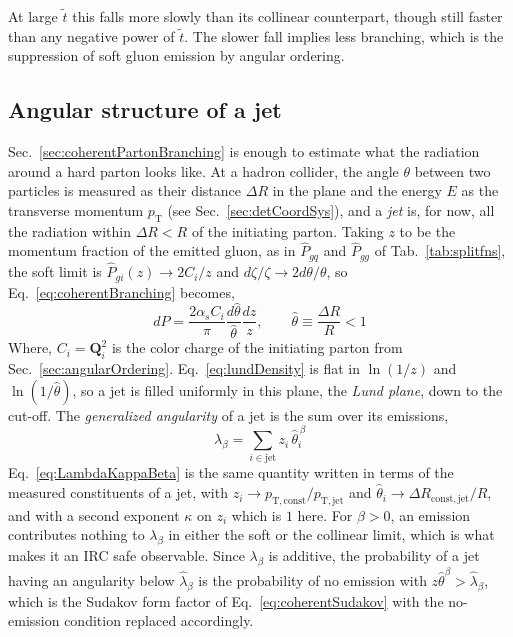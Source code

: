 At large \(\tilde{t}\) this falls more slowly than its collinear counterpart, though
still faster than any negative power of \(\tilde{t}\). The slower fall implies less
branching, which is the suppression of soft gluon emission by angular ordering.

\subsection{Angular structure of a jet}
\label{sec:angularityEstimate}
Sec.~\ref{sec:coherentPartonBranching} is enough to estimate what the radiation around a hard parton looks like. 
%
At a hadron collider, the angle \(\theta\) between two particles is measured as their distance \(\Delta R\) in the \etaphi plane and the energy \(E\) as the transverse momentum \(p_\mathrm{T}\) (see Sec.~\ref{sec:detCoordSys}), and a \emph{jet} is, for now, all the radiation within \(\Delta R < R\) of the initiating parton. 
%
Taking \(z\) to be the momentum fraction of the emitted gluon, as in \(\hat{P}_{gq}\) and \(\hat{P}_{gg}\) of Tab.~\ref{tab:splitfns}, the soft limit is \(\hat{P}_{gi}(z) \to 2C_i/z\) and \(d\zeta/\zeta \to 2d\theta/\theta\), so Eq.~\ref{eq:coherentBranching} becomes,
\begin{equation}
	dP = \frac{2\alpha_s C_i}{\pi}\frac{d\hat{\theta}}{\hat{\theta}}\frac{dz}{z}, \qquad \hat{\theta} \equiv \frac{\Delta R}{R} < 1
	\label{eq:lundDensity}
\end{equation}
Where, \(C_i = \mathbf{Q}_i^2\) is the color charge of the initiating parton from Sec.~\ref{sec:angularOrdering}. 
%
Eq.~\ref{eq:lundDensity} is flat in \(\ln(1/z)\) and \(\ln(1/\hat{\theta})\), so a jet is filled uniformly in this plane, the \emph{Lund plane}, down to the cut-off. 
%
The \emph{generalized angularity} of a jet is the sum over its emissions,
\begin{equation}
	\lambda_\beta = \sum_{i \in \mathrm{jet}} z_i\,\hat{\theta}_i^{\,\beta}
	\label{eq:angularityShower}
\end{equation}
Eq.~\ref{eq:LambdaKappaBeta} is the same quantity written in terms of the measured constituents of a jet, with \(z_i \to p_\mathrm{T, const}/p_\mathrm{T, jet}\) and \(\hat{\theta}_i \to \Delta R_\mathrm{const, jet}/R\), and with a second exponent \(\kappa\) on \(z_i\) which is \(1\) here. 
%
For \(\beta > 0\), an emission contributes nothing to \(\lambda_\beta\) in either the soft or the collinear limit, which is what makes it an IRC safe observable. 
%
Since \(\lambda_\beta\) is additive, the probability of a jet having an angularity below \(\hat{\lambda}_\beta\) is the probability of no emission with \(z\hat{\theta}^\beta > \hat{\lambda}_\beta\), which is the Sudakov form factor of Eq.~\ref{eq:coherentSudakov} with the no-emission condition replaced accordingly. 
